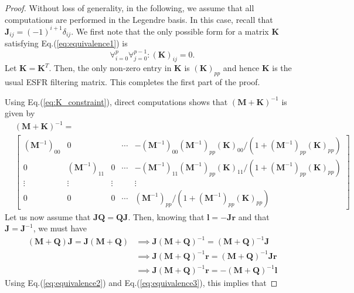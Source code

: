 \documentclass[10pt,a4paper]{amsart}
\begin{document}
\begin{proof}
Without loss of generality, in the following, we assume that all computations are performed in the Legendre basis. In this case, recall that $\mathbf{J}_{ij} = (-1)^{i+1} \delta_{ij}$. We first note that the only possible form for a matrix $\mathbf{K}$ satisfying Eq.(\ref{eq:equivalence1}) is
\begin{equation}
    \forall_{i=0}^p \forall_{j=0}^{p-1} : (\mathbf{K})_{ij} = 0.
    \label{eq:K_constraint}
\end{equation}
Let $\mathbf{K} = \mathbf{K}^T$. Then, the only non-zero entry in $\mathbf{K}$ is $(\mathbf{K})_{pp}$ and hence $\mathbf{K}$ is the usual ESFR filtering matrix. This completes the first part of the proof.

Using Eq.(\ref{eq:K_constraint}), direct computations shows that $(\mathbf{M}+\mathbf{K})^{-1}$ is given by
\begin{align}
    &(\mathbf{M} + \mathbf{K})^{-1} \nonumber
    =\\
    &\begin{bmatrix}
        (\mathbf{M}^{-1})_{00} &0 & & \cdots& -(\mathbf{M}^{-1})_{00}(\mathbf{M}^{-1})_{pp}(\mathbf{K})_{00}/(1+(\mathbf{M}^{-1})_{pp}(\mathbf{K})_{pp}) \\
        0&(\mathbf{M}^{-1})_{11}&0 & \cdots& -(\mathbf{M}^{-1})_{11}(\mathbf{M}^{-1})_{pp}(\mathbf{K})_{11}/(1+(\mathbf{M}^{-1})_{pp}(\mathbf{K})_{pp}) \\
        \vdots&\vdots&\vdots && \vdots \\
        0&0&0&\cdots&(\mathbf{M}^{-1})_{pp}/(1+(\mathbf{M}^{-1})_{pp} (\mathbf{K})_{pp})
    \end{bmatrix}
    \label{eq:MK_form}
\end{align}
Let us now assume that $\mathbf{J}\mathbf{Q} = \mathbf{Q}\mathbf{J}$. Then, knowing that $\mathbf{l} = -\mathbf{J}\mathbf{r}$ and that $\mathbf{J} = \mathbf{J}^{-1}$, we must have
\begin{align}
    (\mathbf{M} + \mathbf{Q})\mathbf{J} = \mathbf{J}(\mathbf{M}+\mathbf{Q})
    &\implies
    \mathbf{J}(\mathbf{M} + \mathbf{Q})^{-1} = (\mathbf{M} + \mathbf{Q})^{-1}\mathbf{J} \\
    &\implies
    \mathbf{J}(\mathbf{M} + \mathbf{Q})^{-1}\mathbf{r} = (\mathbf{M} + \mathbf{Q})^{-1}\mathbf{J}\mathbf{r} \\
    &\implies
    \mathbf{J}(\mathbf{M} + \mathbf{Q})^{-1}\mathbf{r} = -(\mathbf{M} + \mathbf{Q})^{-1}\mathbf{l}
\end{align}
Using Eq.(\ref{eq:equivalence2}) and Eq.(\ref{eq:equivalence3}), this implies that

\end{proof}
\end{document}
